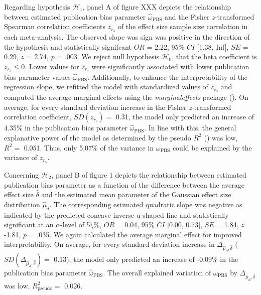 \documentclass[
  12pt,
]{scrartcl}
\newcommand{\pbs}{\omega_{\text{PBS}}}
\newcommand{\epbs}{\widehat{\omega}_{\text{PBS}}}
\begin{document}
Regarding hypothesis \(\mathcal{H}_1\), panel A of figure XXX depicts
the relationship between estimated publication bias parameter \(\epbs\)
and the Fisher \emph{z}-transformed Spearman correlation coefficients
\(z_{r_s}\) of the effect size sample size correlation in each
meta-analysis. The observed slope was sign was positive in the direction
of the hypothesis and statistically signifcant \(OR\) = 2.22, 95\%
\(CI\) {[}1.38, Inf{]}, \(SE\) = 0.29, \(z\) = 2.74, \(p\) = .003. We
reject null hypothesis \(\mathcal{H}_{0}\), that the beta coefficient is
\(z_{r_s} \leq 0\). Lower values for \(z_{r_s}\) were significantly
associated with lower publication bias parameter values \(\epbs\).
Additionally, to enhance the interpretability of the regression slope,
we refitted the model with standardized values of \(z_{r_s}\) and
computed the average marginal effects using the \emph{marginaleffects}
package (). On average, for every standard deviation increase in the Fisher
\emph{z}-transformed correlation coefficient, \(SD(z_{r_s})=\) 0.31, the
model only predicted an increase of 4.35\% in the publication bias
parameter \(\widehat{\omega}_{\text{PBS}}\). In line with this, the
general explanative power of the model as determined by the pseudo
\(R^2\) () was low, \(R^2=\) 0.051. Thus, only 5.07\% of the variance in
\(\pbs\) could be explained by the variance of \(z_{r_s}\).

Concerning \(\mathcal{H}_2\), panel B of figure 1 depicts the
relationship between estimated publication bias parameter as a function
of the difference between the average effect size \(\widehat{\delta}\)
and the estimated mean parameter of the Gaussian effect size
distribution \(\widehat{\mu}_d\). The corresponding estimated quadratic
slope was negative as indicated by the predicted concave inverse
u-shaped line and statistically significant at an \(\alpha\)-level of
5\textbackslash\%, \(OR\) = 0.04, 95\% \(CI\) {[}0.00, 0.73{]}, \(SE\) =
1.84, \(z\) = -1.81, \(p\) = .035. We again calculated the average
marginal effect for improved interpretability. On average, for every
standard deviation increase in
\(\Delta_{\widehat{\mu}_d,\widehat{\delta}}\)
(\(SD(\Delta_{\widehat{\mu}_d,\widehat{\delta}})=\) 0.13), the model
only predicted an increase of -0.09\% in the publication bias parameter
\(\widehat{\omega}_{\text{PBS}}\). The overall explained variation of
\(\pbs\) by \(\Delta_{\widehat{\mu}_d,\widehat{\delta}}\) was low,
\(R^2_{\text{pseudo}}=\) 0.026.
\end{document}
